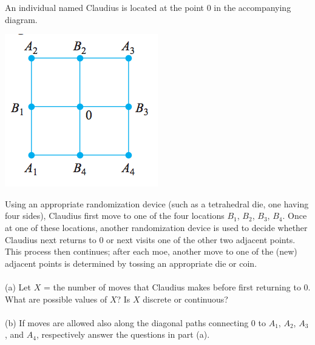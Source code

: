 \documentclass[12pt,letterpaper]{hmcpset}
\begin{document}

\begin{problem}[3.1.9]
An individual named Claudius is located at the point 0 in the accompanying diagram.\\
\begin{center}
	\includegraphics{Nov_10_1.png}
\end{center}
Using an appropriate randomization device (such as a tetrahedral die, one having four sides), Claudius first move to one of the four locations $B_1$, $B_2$, $B_3$, $B_4$. Once at one of these locations, another randomization device is used to decide whether Claudius next returns to 0 or next visits one of the other two adjacent points. This process then continues; after each moe, another move to one of the (new) adjacent points is determined by tossing an appropriate die or coin.\\
\\(a) Let $X$ = the number of moves that Claudius makes before first returning to 0. What are possible values of $X$? Is $X$ discrete or continuous?\\
\\(b) If moves are allowed also along the diagonal paths connecting 0 to $A_1$, $A_2$, $A_3$, and $A_4$, respectively answer the questions in part (a).
\end{problem}

\begin{solution}

\end{solution}
\newpage
\end{document}
